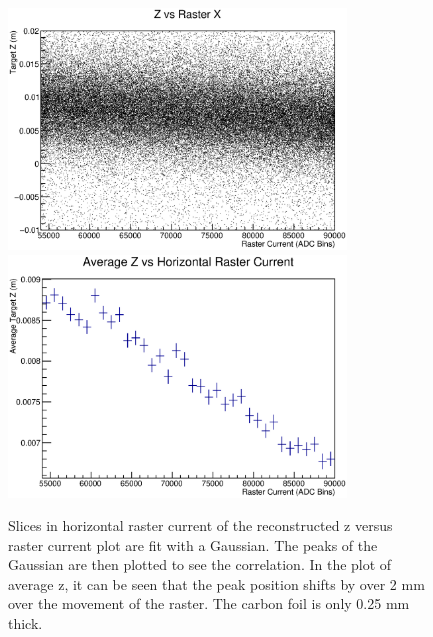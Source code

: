 \begin{figure}
\begin{center}
	\includegraphics[width=0.8\textwidth]{./app1/figures/old1_zvx.eps}
	\includegraphics[width=0.8\textwidth]{./app1/figures/old1_avgzvx_nofit.eps}
	\caption{Slices in horizontal raster current of the reconstructed z versus raster current plot are fit with a Gaussian. The peaks of the Gaussian are then plotted to see the correlation. In the plot of average z, it can be seen that the peak position shifts by over 2 mm over the movement of the raster. The carbon foil is only 0.25 mm thick.}
	\label{fig:oldzvx}
\end{center}
\end{figure}

